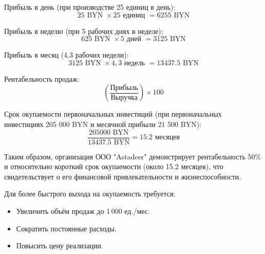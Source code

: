Прибыль в день (при производстве 25 единиц в день):
\begin{equation}
25 \text{ BYN } \times 25 \text{ единиц } = 6255 \text{ BYN}
\end{equation}

Прибыль в неделю (при 5 рабочих днях в неделе):
\begin{equation}
625 \text{ BYN } \times 5 \text{ дней } = 3 125\text{ BYN}
\end{equation}

Прибыль в месяц (4,3 рабочих недели):
\begin{equation}
3 125 \text{ BYN } \times 4,3 \text{ недель } = 13 437.5 \text{ BYN}
\end{equation}

Рентабельность продаж:
\begin{equation}
\left(\frac{\text{Прибыль}}{\text{Выручка}}\right) \times 100%
\end{equation}

Срок окупаемости первоначальных инвестиций (при первоначальных инвестициях 205 000 BYN и месячной прибыли 21 500 BYN):
\begin{equation}
\frac{205 000 \text{ BYN}}{13 437.5 \text{ BYN}} = 15.2 \text{ месяцев}
\end{equation}

Таким образом, организация ООО "Astadeer" демонстрирует  рентабельность 50\% и относительно короткий срок окупаемости (около 15.2 месяцев), что свидетельствует о его финансовой привлекательности и жизнеспособности.

 Для более быстрого выхода на окупаемость требуется:
\begin{itemize}
    \item Увеличить объём продаж до 1\,000 ед./мес.
    \item Сократить постоянные расходы.
    \item Повысить цену реализации.
\end{itemize}




